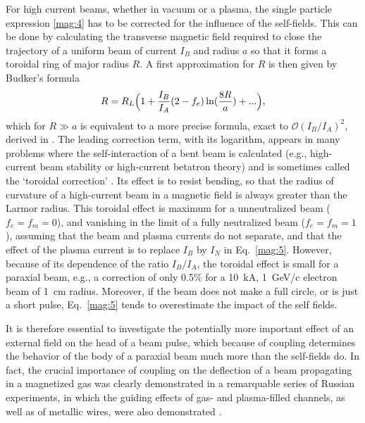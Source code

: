 \documentclass [12pt,a4paper,     ]{report} %
\begin{document}
   For high current beams, whether in vacuum or a plasma, the single particle expression \eqref{mag:4} has to be corrected for the influence of the self-fields.  This can be done by calculating the transverse magnetic field required to close the trajectory of a uniform beam of current $I_B$ and radius $a$ so that it forms a toroidal ring of major radius $R$.  A first approximation for $R$ is then given by Budker's formula \cite[p.676]{BUDKE1956B}
%
\begin{equation}\label{mag:5} %
   R = R_L \Bigl(1 + \frac{I_B}{I_A} (2-f_e) \ln (\frac{8R}{a}) + ... \Bigr),
\end{equation}
%
which for $R \gg a$ is equivalent to a more precise formula, exact to $\mathcal{O}(I_B/I_A)^2$, derived in \cite{OTT--1971A, OTT--1971B}.  The leading correction term, with its logarithm, appears in many problems where the self-interaction of a bent beam is calculated (e.g., high-current beam stability or high-current betatron theory) and is sometimes called the `toroidal correction' \cite{OTT--1971B}.  Its effect is to resist bending, so that the radius of curvature of a high-current beam in a magnetic field is always greater than the Larmor radius.  This toroidal effect is maximum for a unneutralized beam ($f_e=f_m=0$), and vanishing in the limit of a fully neutralized beam ($f_e=f_m=1$), assuming that the beam and plasma currents do not separate, and that the effect of the plasma current is to replace $I_B$ by $I_N$ in Eq.~\eqref{mag:5}.  However, because of its dependence of the ratio $I_B/I_A$, the toroidal effect is small for a paraxial beam, e.g., a correction of only 0.5\% for a 10~kA, 1~GeV/c electron beam of 1~cm radius.  Moreover, if the beam does not make a full circle, or is just a short pulse, Eq.~\eqref{mag:5} tends to overestimate the impact of the self fields.

   It is therefore essential to investigate the potentially more important effect of an external field on the head of a beam pulse, which because of coupling determines the behavior of the body of a paraxial beam much more than the self-fields do.  In fact, the crucial importance of coupling on the deflection of a beam propagating in a magnetized gas was clearly demonstrated in a remarquable series of Russian experiments, in which the guiding effects of gas- and plasma-filled channels, as well as of metallic wires, were also demonstrated \cite{DIDEN1977-}.
\end{document}
